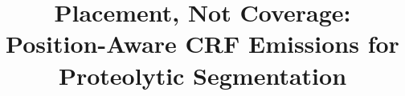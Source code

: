 \documentclass{article}
\begin{document}
\title{Placement, Not Coverage: Position-Aware CRF Emissions for
Proteolytic Segmentation}

\maketitle

%
%
%
\end{document}
